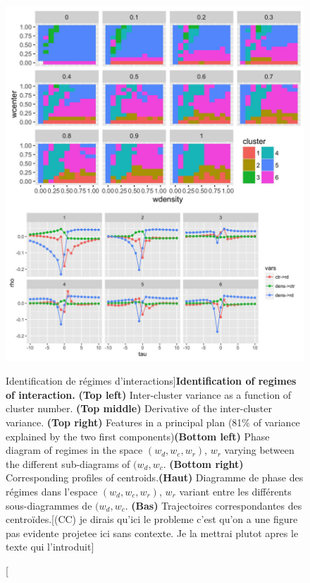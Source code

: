 \begin{figure}
\includegraphics[width=\linewidth]{Figures/Final/4-2-2-fig-causalityregimes-clustering.jpg}
\caption[Identification of interaction regimes][Identification de régimes d'interactions]{\textbf{Identification of regimes of interaction.} \textbf{(Top left)} Inter-cluster variance as a function of cluster number. \textbf{(Top middle)} Derivative of the inter-cluster variance. \textbf{(Top right)} Features in a principal plan (81\% of variance explained by the two first components)\textbf{(Bottom left)} Phase diagram of regimes in the space $(w_{d},w_{c},w_{r})$, $w_r$ varying between the different sub-diagrams of $(w_{d},w_{c}$. \textbf{(Bottom right)} Corresponding profiles of centroids.\label{fig:causalityregimes:clustering}}{\textbf{(Haut)} Diagramme de phase des régimes dans l'espace $(w_{d},w_{c},w_{r})$, $w_r$ variant entre les différents sous-diagrammes de $(w_{d},w_{c}$. \textbf{(Bas)} Trajectoires correspondantes des centroïdes.[(CC) je dirais qu'ici le probleme c'est qu'on a une figure pas evidente projetee ici sans contexte. Je la mettrai plutot apres le texte qui l'introduit]\label{fig:causalityregimes:clustering}}
\end{figure}














